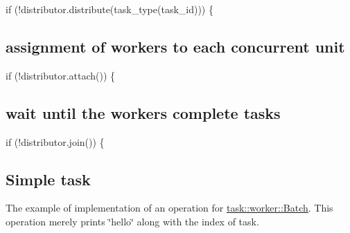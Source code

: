 \begin{DoxyCodeInclude}
        \textcolor{keywordflow}{if} (!distributor.distribute(task\_type(task\_id))) \{

\end{DoxyCodeInclude}
\hypertarget{hryky_1_1task_attach}{}\subsection{assignment of workers to each concurrent unit}\label{hryky_1_1task_attach}

\begin{DoxyCodeInclude}
    \textcolor{keywordflow}{if} (!distributor.attach()) \{

\end{DoxyCodeInclude}
\hypertarget{hryky_1_1task_join}{}\subsection{wait until the workers complete tasks}\label{hryky_1_1task_join}

\begin{DoxyCodeInclude}
    \textcolor{keywordflow}{if} (!distributor.join()) \{

\end{DoxyCodeInclude}
\hypertarget{hryky_1_1task_HelloTask}{}\subsection{Simple task}\label{hryky_1_1task_HelloTask}
The example of implementation of an operation for \hyperlink{classhryky_1_1task_1_1worker_1_1_batch}{task\-::worker\-::\-Batch}. This operation merely prints \char`\"{}hello\char`\"{} along with the index of task.





